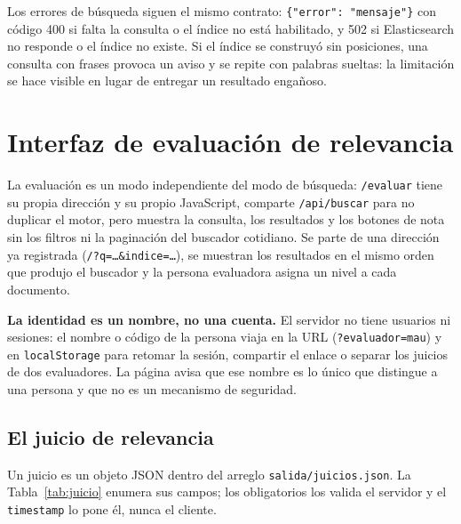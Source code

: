 \documentclass[11pt,spanish]{article}
\begin{document}
Los errores de búsqueda siguen el mismo contrato:
\texttt{\{"error": "mensaje"\}} con código 400 si falta la consulta o el índice
no está habilitado, y 502 si Elasticsearch no responde o el índice no existe.
Si el índice se construyó sin posiciones, una consulta con frases provoca un
aviso y se repite con palabras sueltas: la limitación se hace visible en lugar
de entregar un resultado engañoso.

\section{Interfaz de evaluación de relevancia}
\label{sec:evaluacion}

La evaluación es un modo independiente del modo de búsqueda: \texttt{/evaluar}
tiene su propia dirección y su propio JavaScript, comparte \texttt{/api/buscar}
para no duplicar el motor, pero muestra la consulta, los resultados y los
botones de nota sin los filtros ni la paginación del buscador cotidiano. Se
parte de una dirección ya registrada (\texttt{/?q=\ldots\&indice=\ldots}), se
muestran los resultados en el mismo orden que produjo el buscador y la persona
evaluadora asigna un nivel a cada documento.

\textbf{La identidad es un nombre, no una cuenta.} El servidor no tiene
usuarios ni sesiones: el nombre o código de la persona viaja en la URL
(\texttt{?evaluador=mau}) y en \texttt{localStorage} para retomar la sesión,
compartir el enlace o separar los juicios de dos evaluadores. La página avisa
que ese nombre es lo único que distingue a una persona y que no es un mecanismo
de seguridad.

\subsection{El juicio de relevancia}
\label{sec:juicio}

Un juicio es un objeto JSON dentro del arreglo \texttt{salida/juicios.json}.
La Tabla~\ref{tab:juicio} enumera sus campos; los obligatorios los valida el
servidor y el \texttt{timestamp} lo pone él, nunca el cliente.
\end{document}

